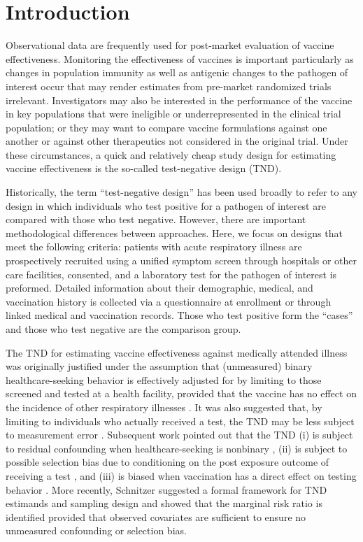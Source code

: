 \documentclass[11pt]{article}
\begin{document}
\section{Introduction} \label{sec:introduction}
Observational data are frequently used for post-market evaluation of vaccine effectiveness. Monitoring the effectiveness of vaccines is important particularly as changes in population immunity as well as antigenic changes to the pathogen of interest occur that may render estimates from pre-market randomized trials irrelevant. Investigators may also be interested in the performance of the vaccine in key populations that were ineligible or underrepresented in the clinical trial population; or they may want to compare vaccine formulations against one another or against other therapeutics not considered in the original trial. Under these circumstances, a quick and relatively cheap study design for estimating vaccine effectiveness is the so-called test-negative design (TND). 
 
Historically, the term ``test-negative design'' has been used broadly to refer to any design in which individuals who test positive for a pathogen of interest are compared with those who test negative. However, there are important methodological differences between approaches. Here, we focus on designs that meet the following criteria: patients with acute respiratory illness are prospectively recruited using a unified symptom screen through hospitals or other care facilities, consented, and a laboratory test for the pathogen of interest is preformed. Detailed information about their demographic, medical, and vaccination history is collected via a questionnaire at enrollment or through linked medical and vaccination records. Those who test positive form the ``cases'' and those who test negative are the comparison group. 

The TND for estimating vaccine effectiveness against medically attended illness was originally justified under the assumption that (unmeasured) binary healthcare-seeking behavior is effectively adjusted for by limiting to those screened and tested at a health facility, provided that the vaccine has no effect on the incidence of other respiratory illnesses \cite{jackson_test-negative_2013}. It was also suggested that, by limiting to individuals who actually received a test, the TND may be less subject to measurement error \cite{jackson_test-negative_2013}. Subsequent work pointed out that the TND (i) is subject to residual confounding when healthcare-seeking is nonbinary \cite{sullivan_theoretical_2016,lewnard_theoretical_2021}, (ii) is subject to possible selection bias due to conditioning on the post exposure outcome of receiving a test \cite{sullivan_theoretical_2016}, and (iii) is biased when vaccination has a direct effect on testing behavior \cite{foppa_case_2013}. More recently, Schnitzer \cite{schnitzer_estimands_2022} suggested a formal framework for TND estimands and sampling design and showed that the marginal risk ratio is identified provided that observed covariates are sufficient to ensure no unmeasured confounding or selection bias. 
\end{document}
